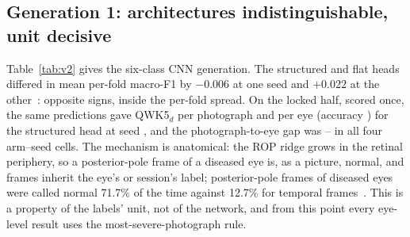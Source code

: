 \documentclass[journal]{IEEEtran}
\begin{document}
\subsection{Generation 1: architectures indistinguishable, unit decisive}
Table~\ref{tab:v2} gives the six-class CNN generation. The structured and flat heads differed in mean per-fold macro-F1 by $-0.006$ at one seed and $+0.022$ at the other~\cite{nagpure2026}: opposite signs, inside the per-fold spread. On the locked half, scored once, the same predictions gave QWK5$_d$ \vTwoLockedImgQ{} per photograph and \vTwoLockedEyeQ{} per eye (accuracy \vTwoLockedEyeAcc{}) for the structured head at seed \seedA{}, and the photograph-to-eye gap was \vTwoGapMin{}--\vTwoGapMax{} in all four arm--seed cells. The mechanism is anatomical: the ROP ridge grows in the retinal periphery, so a posterior-pole frame of a diseased eye is, as a picture, normal, and frames inherit the eye's or session's label; posterior-pole frames of diseased eyes were called normal 71.7\% of the time against 12.7\% for temporal frames~\cite{nagpure2026}. This is a property of the labels' unit, not of the network, and from this point every eye-level result uses the most-severe-photograph rule.

\begin{table}[!t]
\caption{Generation 1 (August 2026): EfficientNetV2-S structured head (CORN ordinal + AP-ROP branch + site adversary, \vtStructParams{} parameters) versus a flat softmax, natural sampling, five-fold patient-grouped cross-validation (CV). QWK$_6$: legacy six-class kappa; QWK5$_d$: rows with true or predicted AP-ROP removed; QWK5: AP-ROP folded onto stage 4/5, the definition used for the transformers. Dev and locked: the held-out cohort; eye = most severe photograph; locked half opened once (\lockedOpened{}). The flat arm is re-scored as arm C in Table~\ref{tab:headline}.}
\label{tab:v2}
\centering\scriptsize\setlength{\tabcolsep}{3.4pt}

\end{table}
\end{document}
